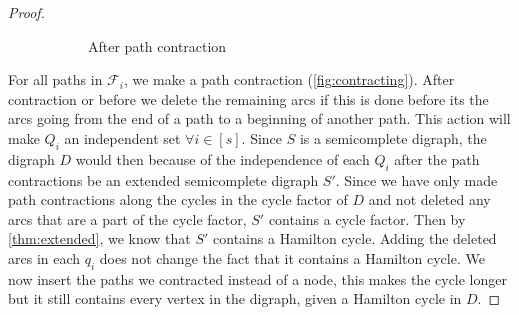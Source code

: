 \begin{proof}
\begin{figure}[htpb]
\begin{subfigure}[b]{1\textwidth}
    \caption{After path contraction}
    \end{subfigure}
    \caption{}
    \label{fig:contracting}
    \end{figure}
    For all paths in $\mathcal{F}_i$, we make a path contraction (\autoref{fig:contracting}). 
    After contraction or before we delete the remaining arcs if this is done before its the arcs going from the end of a path to a beginning of another path. 
    This action will make $Q_i$ an independent set $\forall i\in [s]$. 
    Since $S$ is a semicomplete digraph, the digraph $D$ would then because of the independence of each $Q_i$ after the path contractions be an extended semicomplete digraph $S'$. 
    Since we have only made path contractions along the cycles in the cycle factor of $D$ and not deleted any arcs that are a part of the cycle factor, $S'$ contains a cycle factor. 
    Then by \autoref{thm:extended}, we know that $S'$ contains a Hamilton cycle. 
    Adding the deleted arcs in each $q_i$ does not change the fact that it contains a Hamilton cycle. We now insert the paths we contracted instead of a node, this makes the cycle longer but it still contains every vertex in the digraph, given a Hamilton cycle in $D$.
\end{proof}

